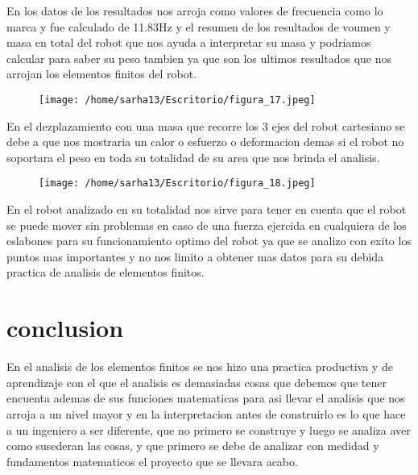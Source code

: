 \documentclass[letter,openright,12pt,spanish]{report}
\begin{document}
En los datos de los resultados nos arroja como valores de frecuencia como lo marca y fue calculado de 11.83Hz y el resumen de los resultados de voumen y masa en total del robot que nos ayuda a interpretar su masa y podriamos calcular para saber su peso tambien ya que son los ultimos resultados que nos arrojan los elementos finitos del robot.

\begin{figure}[htp!]
\centering
\texttt{[image: /home/sarha13/Escritorio/figura\_17.jpeg]}
\caption{}
\label{Figura 7.}
\end{figure}

En el dezplazamiento con una masa que recorre los 3 ejes del robot cartesiano se debe a que nos mostraria un calor o esfuerzo o deformacion demas si el robot no soportara el peso en toda su totalidad de su area que nos brinda el analisis.

\begin{figure}[htp!]
\centering
\texttt{[image: /home/sarha13/Escritorio/figura\_18.jpeg]}
\caption{}
\label{Figura 7.}
\end{figure}

En el robot analizado en su totalidad nos sirve para tener en cuenta que el robot se puede mover sin problemas en caso de una fuerza ejercida en cualquiera de los eslabones para su funcionamiento optimo del robot ya que se analizo con exito los puntos mas importantes  y no nos limito a obtener mas datos para su debida practica de analisis de elementos finitos.

\section{conclusion}
En el analisis de los elementos finitos se nos hizo una practica productiva y de aprendizaje con el que el analisis es demasiadas cosas que debemos que tener encuenta ademas de sus funciones matematicas para asi llevar el analisis que nos arroja a un nivel mayor y en la interpretacion antes de construirlo es lo que hace a un ingeniero a ser diferente, que no primero se construye y luego se analiza aver como susederan las cosas, y que primero se debe de analizar con medidad y fundamentos matematicos el proyecto que se llevara acabo.\\\\
\end{document}

